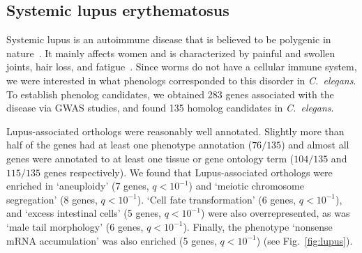 \documentclass[10pt,letterpaper,twocolumn]{article}
\newcommand{\cel}{\emph{C.~elegans}}
\newcommand{\hlupus}{283}
\newcommand{\wlupus}{135}
\newcommand{\qval}[1]{\ensuremath{q<10^{-#1}}}
\begin{document}
\subsection*{Systemic lupus erythematosus}
Systemic lupus is an autoimmune disease that is believed to be polygenic in
nature~\cite{Mohan2015}. It mainly affects women and is characterized by painful
and swollen joints, hair loss, and fatigue~\cite{Lisnevskaia2014}. Since worms do not have a
cellular immune system, we were interested in what phenologs corresponded to
this disorder in \cel{}. To establish phenolog candidates, we obtained
\hlupus{} genes associated with the disease via GWAS studies, and found
\wlupus{} homolog candidates in \cel{}.

Lupus-associated orthologs were reasonably well annotated. Slightly more than half
of the genes had at least one phenotype annotation ($76/\wlupus{}$) and almost
all genes were annotated to at least one tissue or gene ontology term
($104/\wlupus{}$ and $115/\wlupus$ genes respectively).
We found that Lupus-associated orthologs were enriched in `aneuploidy' (7 genes,
\qval{1}) and `meiotic chromosome segregation' (8 genes, \qval{1}). `Cell fate
transformation' (6 genes, \qval{1}), and `excess intestinal cells'
(5 genes, \qval{1}) were also overrepresented, as was `male tail morphology'
(6 genes, \qval{1}). Finally, the phenotype `nonsense mRNA accumulation' was also
enriched (5 genes, \qval{1}) (see Fig.~\ref{fig:lupus}).
\end{document}

